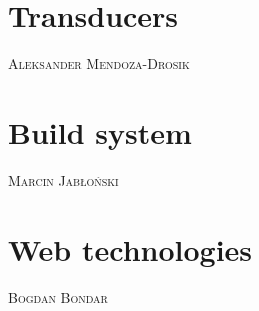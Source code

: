 \documentclass[oneside,english,logo]{amuthesis}
\makeatletter
\newcommand{\chapterauthor}[1]{%
	{\centering\vspace*{-25pt}%
		\linespread{1.1}\large\scshape#1%
		\par\nobreak\vspace*{35pt}}
	\@afterheading%
}
\makeatother
\begin{document}
	\chapter{Transducers}
	\chapterauthor{Aleksander Mendoza-Drosik}
	
	
	\chapter{Build system}
	\chapterauthor{Marcin Jabłoński}	
	
	
	\chapter{Web technologies}
	\chapterauthor{Bogdan Bondar}	
	
	
	
	
\end{document}
